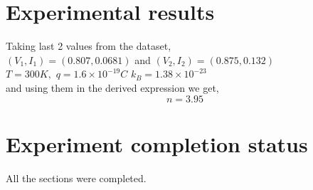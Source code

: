 \documentclass[12pt]{article}
\begin{document}
\section{Experimental results}
Taking last 2 values from the dataset,\\
$(V_{1},I_{1})=(0.807,0.0681)$ and $(V_{2},I_{2})=(0.875,0.132)$ \\
$T=300K,$ $q=1.6 \times 10^{-19} C$ $k_{B}=1.38\times10^{-23}$ \\
and using them in the derived expression we get, $$n=3.95$$
\section{Experiment completion status}
All the sections were completed.
\end{document}

